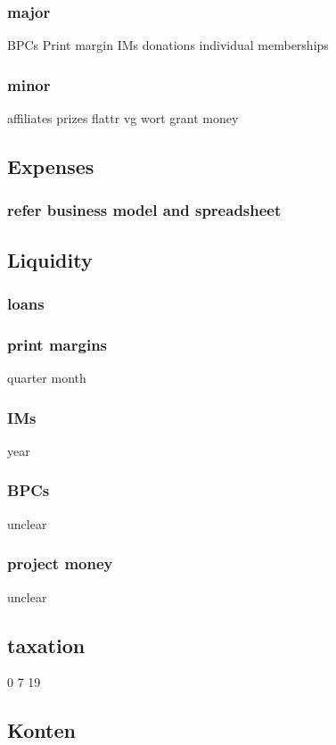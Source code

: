 \documentclass[output=guidelines,guidelines] {langscibook}
\begin{document}
\subsubsection{major}
                    BPCs
                    Print margin
                    IMs
                    donations
                    individual memberships
\subsubsection{minor}
                    affiliates
                    prizes
                    flattr
                    vg wort
                    grant money
\subsection{Expenses}
\subsubsection{refer business model and spreadsheet}
\subsection{Liquidity}
\subsubsection{loans}
\subsubsection{print margins}
                    quarter
                    month
\subsubsection{IMs}
                    year
\subsubsection{BPCs}
                    unclear
\subsubsection{project money}
                    unclear
\subsection{taxation}
                0
                7
                19
\subsection{Konten}
\end{document}
